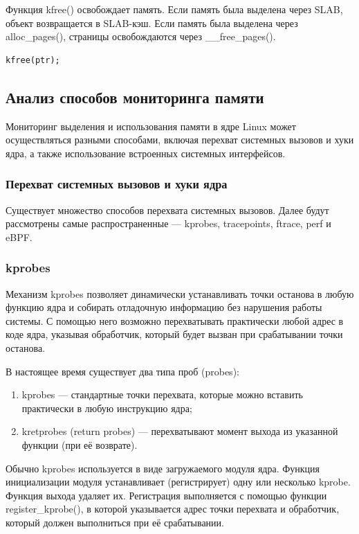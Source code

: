Функция kfree() освобождает память.
Если память была выделена через SLAB, объект возвращается в SLAB-кэш.
Если память была выделена через alloc\_pages(), страницы освобождаются через \_\_free\_pages().

\begin{lstlisting}[caption={kfree}]
kfree(ptr);
\end{lstlisting}

\subsection{Анализ способов мониторинга памяти}

Мониторинг выделения и использования памяти в ядре Linux может осуществляться разными способами, включая перехват системных вызовов и хуки ядра, а также использование встроенных системных интерфейсов.

\subsubsection{Перехват системных вызовов и хуки ядра}

Существует множество способов перехвата системных вызовов.
Далее будут рассмотрены самые распространенные --- kprobes, tracepoints, ftrace, perf и eBPF.

\subsubsection*{kprobes}

Механизм kprobes позволяет динамически устанавливать точки останова в любую функцию ядра и собирать отладочную информацию без нарушения работы системы.
С помощью него возможно перехватывать практически любой адрес в коде ядра, указывая обработчик, который будет вызван при срабатывании точки останова.~\cite{kprobe}

В настоящее время существует два типа проб (probes):
\begin{enumerate}
    \item kprobes --- стандартные точки перехвата, которые можно вставить практически в любую инструкцию ядра;
    \item kretprobes (return probes) --- перехватывают момент выхода из указанной функции (при её возврате).
\end{enumerate}

Обычно kprobes используется в виде загружаемого модуля ядра.
Функция инициализации модуля устанавливает (регистрирует) одну или несколько kprobe.
Функция выхода удаляет их.
Регистрация выполняется с помощью функции register\_kprobe(), в которой указывается адрес точки перехвата и обработчик, который должен выполниться при её срабатывании.~\cite{kprobe}

